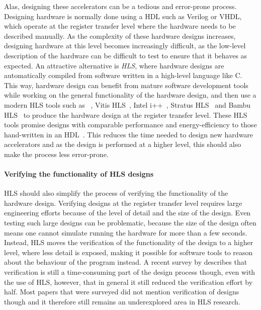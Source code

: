 Alas, designing these accelerators can be a tedious and error-prone process.
Designing hardware is normally done using a \gls{HDL} such as Verilog or VHDL,
which operate at the register transfer level where the hardware needs to be
described manually.  As the complexity of these hardware designs increases,
designing hardware at this level becomes increasingly difficult, as the
low-level description of the hardware can be difficult to test to ensure that it
behaves as expected.  An attractive alternative is \emph{\gls{HLS}}, where
hardware designs are automatically compiled from software written in a
high-level language like C.  This way, hardware design can benefit from mature
software development tools while working on the general functionality of the
hardware design, and then use a modern \gls{HLS} tools such as
\legup{}~\cite{canis13_l}, Vitis HLS~\cite{amd23_vitis_high_synth}, Intel
i++~\cite{intel20_hsc}, Stratus HLS~\cite{roane23_autom_hw_sw_co_desig} and
Bambu HLS~\cite{pilato13_bambu} to produce the hardware design at the register
transfer level.  These \gls{HLS} tools promise designs with comparable
performance and energy-efficiency to those hand-written in an
\gls{HDL}~\cite{homsirikamol14_can, gauthier20_high_level_synth,
  pelcat16_desig_hdl}.  This reduces the time needed to design new hardware
accelerators and as the design is performed at a higher level, this should also
make the process less error-prone.

\paragraph{Verifying the functionality of HLS designs} \Gls{HLS} should also
simplify the process of verifying the functionality of the hardware design.
Verifying designs at the register transfer level requires large engineering
efforts because of the level of detail and the size of the design.  Even testing
such large designs can be problematic, because the size of the design often
means one cannot simulate running the hardware for more than a few seconds.
Instead, \gls{HLS} moves the verification of the functionality of the design to
a higher level, where less detail is exposed, making it possible for software
tools to reason about the behaviour of the program instead. A recent survey by
\textcite{lahti19_are_we_there_yet} describes that verification is still a
time-consuming part of the design process though, even with the use of
\gls{HLS}, however, that in general it still reduced the verification effort by
half.  Most papers that were surveyed did not mention verification of designs
though and it therefore still remains an underexplored area in \gls{HLS}
research.

